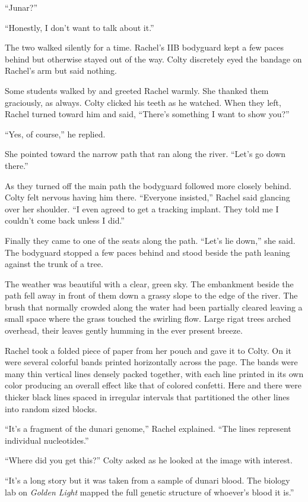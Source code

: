 ``Junar?''

``Honestly, I don't want to talk about it.''

The two walked silently for a time. Rachel's IIB bodyguard kept a few paces behind but otherwise
stayed out of the way. Colty discretely eyed the bandage on Rachel's arm but said nothing.

Some students walked by and greeted Rachel warmly. She thanked them graciously, as always. Colty
clicked his teeth as he watched. When they left, Rachel turned toward him and said, ``There's
something I want to show you?''

``Yes, of course,'' he replied.

She pointed toward the narrow path that ran along the river. ``Let's go down there.''

As they turned off the main path the bodyguard followed more closely behind. Colty felt nervous
having him there. ``Everyone insisted,'' Rachel said glancing over her shoulder. ``I even agreed
to get a tracking implant. They told me I couldn't come back unless I did.''

Finally they came to one of the seats along the path. ``Let's lie down,'' she said. The
bodyguard stopped a few paces behind and stood beside the path leaning against the trunk of a
tree.

The weather was beautiful with a clear, green sky. The embankment beside the path fell away in
front of them down a grassy slope to the edge of the river. The brush that normally crowded
along the water had been partially cleared leaving a small space where the grass touched the
swirling flow. Large rigat trees arched overhead, their leaves gently humming in the ever
present breeze.

Rachel took a folded piece of paper from her pouch and gave it to Colty. On it were several
colorful bands printed horizontally across the page. The bands were many thin vertical lines
densely packed together, with each line printed in its own color producing an overall effect
like that of colored confetti. Here and there were thicker black lines spaced in irregular
intervals that partitioned the other lines into random sized blocks.

``It's a fragment of the dunari genome,'' Rachel explained. ``The lines represent individual
nucleotides.''

``Where did you get this?'' Colty asked as he looked at the image with interest.

``It's a long story but it was taken from a sample of dunari blood. The biology lab on
\textit{Golden Light} mapped the full genetic structure of whoever's blood it is.''

